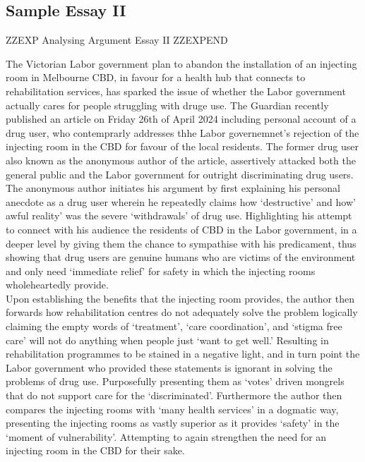 \documentclass[a4paper]{article}
\begin{document}
\newpage

\subsection{Sample Essay II}


ZZEXP Analysing Argument Essay II ZZEXPEND


The Victorian Labor government plan to abandon the installation of an injecting room in Melbourne CBD, in favour for a health hub that connects to rehabilitation services, has sparked the issue of whether the Labor government actually cares for people struggling with druge use. The Guardian recently published an article on Friday 26th of April 2024 including personal account of a drug user, who contemprarly addresses thhe Labor governemnet's rejection of the injecting room in the CBD for favour of the local residents. The former drug user also known as the anonymous author of the article, assertively attacked both the general public and the Labor government for outright discriminating drug users.\\

The anonymous author initiates his argument by first explaining his personal anecdote as a drug user wherein he repeatedly claims how ‘destructive’ and how’ awful reality’ was the severe ‘withdrawals’ of drug use. Highlighting his attempt to connect with his audience the residents of CBD in the Labor government, in a deeper level by giving them the chance to sympathise with his predicament, thus showing that drug users are genuine humans who are victims of the environment and only need ‘immediate relief’ for safety in which the injecting rooms wholeheartedly provide.\\

Upon establishing the benefits that the injecting room provides, the author then forwards how rehabilitation centres do not adequately solve the problem logically claiming the empty words of ‘treatment’, ‘care coordination’, and ‘stigma free care’ will not do anything when people just ‘want to get well.’ Resulting in rehabilitation programmes to be stained in a negative light, and in turn point the Labor government who provided these statements is ignorant in solving the problems of drug use. Purposefully presenting them as ‘votes’ driven mongrels that do not support care for the ‘discriminated’. Furthermore the author then compares the injecting rooms with ‘many health services’ in a dogmatic way, presenting the injecting rooms as vastly superior as it provides ‘safety’ in the ‘moment of vulnerability’. Attempting to again strengthen the need for an injecting room in the CBD for their sake.\\
\end{document}
